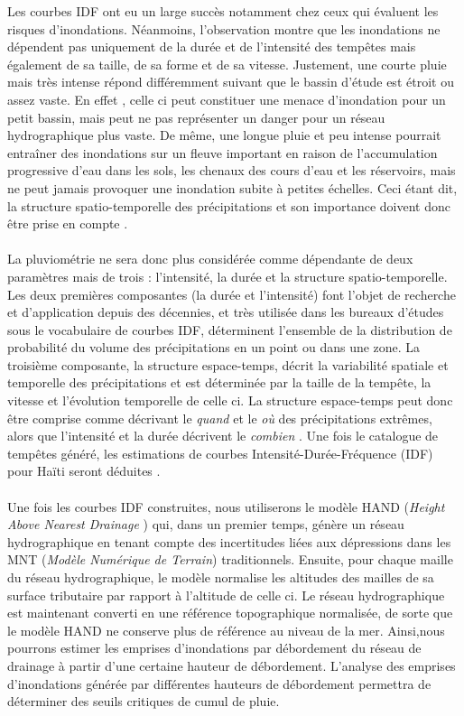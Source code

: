 Les courbes IDF ont eu un large succès notamment chez ceux qui évaluent les risques d'inondations. N\'eanmoins, l'observation montre que les inondations ne d\'ependent pas uniquement de la dur\'ee et de l'intensit\'e des temp\^etes mais \'egalement de sa taille, de sa forme et de sa vitesse. Justement, une courte pluie mais tr\`es intense r\'epond diff\'eremment suivant que le bassin d'\'etude est \'etroit ou assez vaste. En effet , celle ci peut constituer une menace  d'inondation pour un petit bassin, mais peut ne pas représenter un danger pour un réseau hydrographique plus vaste. De m\^eme, une longue pluie  et peu intense  pourrait entra\^iner des inondations sur un fleuve important en raison de l'accumulation progressive d'eau dans les sols, les chenaux des cours d'eau et les réservoirs, mais ne peut jamais  provoquer une inondation subite à petites échelles. Ceci \'etant dit, la structure spatio-temporelle des précipitations et son importance doivent donc être prise en compte \cite{wright_remote_2017}.\\ \ \\
La pluviométrie ne sera donc plus considérée comme dépendante de  deux paramètres mais de trois : l'intensité, la durée et la structure spatio-temporelle.  Les deux premières composantes (la durée et l'intensité) font l'objet de recherche et d'application depuis des décennies, et très utilis\'ee dans les bureaux d'études sous le vocabulaire de courbes IDF, déterminent l'ensemble de la distribution de probabilité du volume des précipitations  en un point ou dans une zone. La troisième composante, la structure espace-temps, décrit la variabilité spatiale et temporelle des précipitations et est déterminée par la taille de la tempête, la vitesse et l'évolution temporelle de celle ci. La structure espace-temps peut donc être comprise comme décrivant le \emph{quand} et le \emph{o\`u} des précipitations extrêmes, alors que l'intensité et la durée décrivent le \emph{combien} \cite{wright_remote_2017}. Une fois le catalogue de tempêtes généré, les estimations de courbes Intensité-Durée-Fréquence (IDF) pour Haïti seront déduites \cite{wright_estimating_2013}. \\ \ \\


Une fois les courbes IDF construites, nous utiliserons le modèle HAND (\emph{Height Above Nearest Drainage} \cite{nobre_height_2011}) qui, dans un premier temps, génère un réseau hydrographique en tenant compte des incertitudes liées aux dépressions dans les MNT (\emph{Modèle Numérique de Terrain}) traditionnels. Ensuite, pour chaque maille du réseau hydrographique, le modèle normalise les altitudes des mailles de sa surface tributaire  par rapport \`a l'altitude de celle ci. Le réseau hydrographique est maintenant converti en une référence topographique normalisée, de sorte que le modèle HAND ne conserve plus de référence au niveau de la mer. Ainsi,nous pourrons estimer les emprises d’inondations par débordement du réseau de drainage
à partir d’une certaine hauteur de débordement. L’analyse des emprises d’inondations
générée par différentes hauteurs de débordement permettra de déterminer des seuils critiques
de cumul de pluie.
